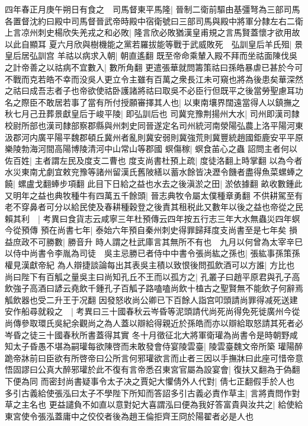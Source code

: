 四年春正月庚午朔日有食之　司馬督東平馬隆|{
	晉制二衛前驅由基彊弩為三部司馬各置督沈約曰殿中司馬督晉武帝時殿中宿衛號曰三部司馬與殿中將軍分隸左右二衛}
上言凉州刺史楊欣失羌戎之和必敗|{
	隆言欣必敗猶漢皇甫規之言馬賢蓋懷才欲用故以此自顯耳}
夏六月欣與樹機能之黨若羅拔能等戰于武威敗死　弘訓皇后羊氏殂|{
	景皇后居弘訓宫}
羊祜以病求入朝|{
	朝直遙翻}
既至帝命乘輦入殿不拜而坐祜面陳伐吳之計帝善之以祜病不宜數入|{
	數所角翻}
更遣張華就問籌策祜曰孫皓暴虐已甚於今可不戰而克若皓不幸而没吳人更立令主雖有百萬之衆長江未可窺也將為後患矣華深然之祜曰成吾志者子也帝欲使祜卧護諸將祜曰取吳不必臣行但既平之後當勞聖慮耳功名之際臣不敢居若事了當有所付授願審擇其人也|{
	以東南壤界闊遠當得人以鎮撫之}
秋七月己丑葬景獻皇后于峻平陵|{
	即弘訓后也}
司冀兖豫荆揚州大水|{
	司州即漢司隸校尉所部也漢司隸部察郡縣與州刺史同晉遂定名司州統河南滎陽弘農上洛平陽河東汲郡河内廣平陽平魏郡頓丘冀州者亂則冀安弱則冀強荒則冀豐統趙國鉅鹿安平平原樂陵勃海河間高陽博陵清河中山常山等郡國}
螟傷稼|{
	螟食苖心之蟲}
詔問主者何以佐百姓|{
	主者謂左民及度支二曹也}
度支尚書杜預上疏|{
	度徒洛翻上時掌翻}
以為今者水災東南尤劇宜敕兖豫等諸州留漢氏舊陂繕以蓄水餘皆决瀝令饑者盡得魚菜螺蜯之饒|{
	螺盧戈翻蜯步項翻}
此目下日給之益也水去之後滇淤之田|{
	淤依據翻}
畝收數鍾此又明年之益也典牧種牛有四萬五千餘頭|{
	晉志典牧令屬太僕種章勇翻}
不供耕駕至有老不穿鼻者可分以給民使及春耕種穀登之後責其租税此又數年以後之益也帝從之民賴其利　|{
	考異曰食貨志云咸寧三年杜預傳云四年按五行志三年大水無蟲災四年螟今從預傳}
預在尚書七年|{
	泰始六年預自秦州刺史得罪歸拜度支尚書至是七年矣}
損益庶政不可勝數|{
	勝音升}
時人謂之杜武庫言其無所不有也　九月以何曾為太宰辛巳以侍中尚書令李胤為司徒　吳主忌勝已者侍中中書令張尚紘之孫也|{
	張紘事孫策孫權見漢獻帝紀}
為人辯捷談論每出其表吳主積以致恨後問孤飲酒可以方誰|{
	方比也}
尚曰陛下有百觚之量吳主曰尚知孔丘不王而以孤方之|{
	孔叢子曰趙平原君與孔子高飲強子高酒曰諺云堯飲千鍾孔子百觚子路嗑嗑尚飲十榼古之聖賢無不能飲子何辭焉觚飲器也受二升王于况翻}
因發怒收尚公卿已下百餘人詣宫叩頭請尚罪得减死送建安作船尋就殺之　|{
	考異曰三十國春秋云岑昏等泥頭請代尚死尚得免死徙廣州今從尚傳參取環氏吳紀余觀尚之為人蓋以辯給得親近於孫皓而亦以辯給取怒請其死者必岑昏之徒三十國春秋所書蓋得其實}
冬十月徵征北大將軍衛瓘為尚書令是時朝野咸知太子昏愚不堪為嗣瓘每欲陳啓而未敢發會侍宴陵雲臺|{
	陵雲臺魏文帝所築}
瓘陽醉跪帝牀前曰臣欲有所啓帝曰公所言何邪瓘欲言而止者三因以手撫牀曰此座可惜帝意悟固謬曰公真大醉邪瓘於此不復有言帝悉召東宮官屬為設宴會|{
	復扶又翻為于偽翻下便為同}
而密封尚書疑事令太子决之賈妃大懼倩外人代對|{
	倩七正翻假手於人也}
多引古義給使張泓曰太子不學陛下所知而答詔多引古義必責作草主|{
	言將責問作對草之主名也}
更益譴負不如直以意對妃大喜謂泓曰便為我好答富貴與汝共之|{
	給使給東宮使令張泓蓋庸中之佼佼者後為趙王倫拒齊王冏於陽翟者必是人也}
